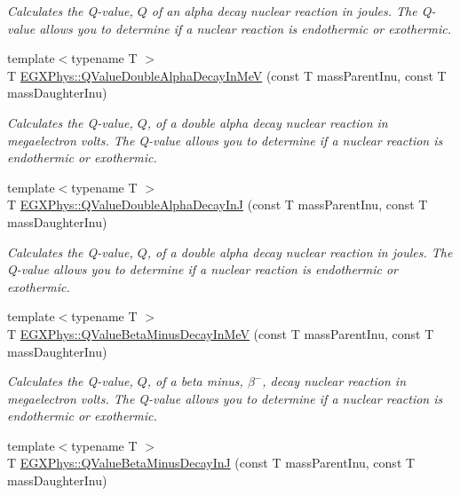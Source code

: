 \begin{DoxyCompactItemize}
\begin{DoxyCompactList}\small\item\em Calculates the Q-\/value, $Q$ of an alpha decay nuclear reaction in joules. The Q-\/value allows you to determine if a nuclear reaction is endothermic or exothermic. \end{DoxyCompactList}\item 
{\footnotesize template$<$typename T $>$ }\\T \mbox{\hyperlink{group___e_g_x_phys-_q_value-_alpha_ga85230c793adc7fc78fef760874f75ad9}{E\+G\+X\+Phys\+::\+Q\+Value\+Double\+Alpha\+Decay\+In\+MeV}} (const T mass\+Parent\+Inu, const T mass\+Daughter\+Inu)
\begin{DoxyCompactList}\small\item\em Calculates the Q-\/value, $Q$, of a double alpha decay nuclear reaction in megaelectron volts. The Q-\/value allows you to determine if a nuclear reaction is endothermic or exothermic. \end{DoxyCompactList}\item 
{\footnotesize template$<$typename T $>$ }\\T \mbox{\hyperlink{group___e_g_x_phys-_q_value-_alpha_ga015ade04346d0c6dae4dda8e3aab8cbd}{E\+G\+X\+Phys\+::\+Q\+Value\+Double\+Alpha\+Decay\+InJ}} (const T mass\+Parent\+Inu, const T mass\+Daughter\+Inu)
\begin{DoxyCompactList}\small\item\em Calculates the Q-\/value, $Q$, of a double alpha decay nuclear reaction in joules. The Q-\/value allows you to determine if a nuclear reaction is endothermic or exothermic. \end{DoxyCompactList}\item 
{\footnotesize template$<$typename T $>$ }\\T \mbox{\hyperlink{group___e_g_x_phys-_q_value-_beta_minus_gaac1374ce9ba39bef416f34298708bda9}{E\+G\+X\+Phys\+::\+Q\+Value\+Beta\+Minus\+Decay\+In\+MeV}} (const T mass\+Parent\+Inu, const T mass\+Daughter\+Inu)
\begin{DoxyCompactList}\small\item\em Calculates the Q-\/value, $Q$, of a beta minus, $\beta^-$, decay nuclear reaction in megaelectron volts. The Q-\/value allows you to determine if a nuclear reaction is endothermic or exothermic. \end{DoxyCompactList}\item 
{\footnotesize template$<$typename T $>$ }\\T \mbox{\hyperlink{group___e_g_x_phys-_q_value-_beta_minus_gae9a4a9f4c6e0f555e20c3144dd7329fc}{E\+G\+X\+Phys\+::\+Q\+Value\+Beta\+Minus\+Decay\+InJ}} (const T mass\+Parent\+Inu, const T mass\+Daughter\+Inu)

\end{DoxyCompactItemize}
